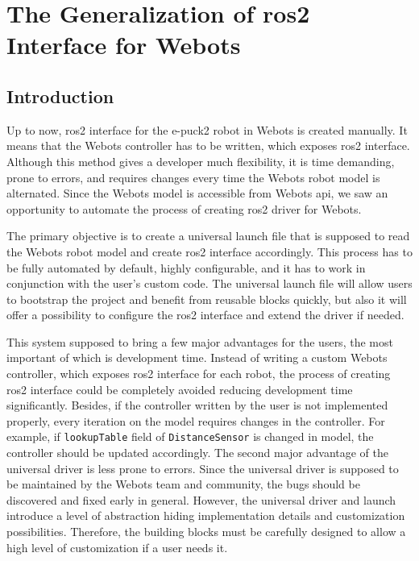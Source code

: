 \chapter{The Generalization of \ac{ros2} Interface for Webots}
\label{chap:generalization}

\section{Introduction}
\label{sec:generalization:introduction}

Up to now, \ac{ros2} interface for the e-puck2 robot in Webots is created manually. It means that the Webots controller has to be written, which exposes \ac{ros2} interface. Although this method gives a developer much flexibility, it is time demanding, prone to errors, and requires changes every time the Webots robot model is alternated. Since the Webots model is accessible from Webots \ac{api}, we saw an opportunity to automate the process of creating \ac{ros2} driver for Webots.

The primary objective is to create a universal launch file that is supposed to read the Webots robot model and create \ac{ros2} interface accordingly. This process has to be fully automated by default, highly configurable, and it has to work in conjunction with the user's custom code. The universal launch file will allow users to bootstrap the project and benefit from reusable blocks quickly, but also it will offer a possibility to configure the \ac{ros2} interface and extend the driver if needed.

This system supposed to bring a few major advantages for the users, the most important of which is development time. Instead of writing a custom Webots controller, which exposes \ac{ros2} interface for each robot, the process of creating \ac{ros2} interface could be completely avoided reducing development time significantly. Besides, if the controller written by the user is not implemented properly, every iteration on the model requires changes in the controller. For example, if \texttt{lookupTable} field of \texttt{DistanceSensor} is changed in model, the controller should be updated accordingly. The second major advantage of the universal driver is less prone to errors. Since the universal driver is supposed to be maintained by the Webots team and community, the bugs should be discovered and fixed early in general. However, the universal driver and launch introduce a level of abstraction hiding implementation details and customization possibilities. Therefore, the building blocks must be carefully designed to allow a high level of customization if a user needs it.

